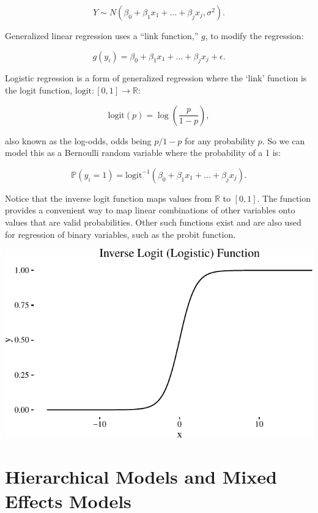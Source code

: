 \documentclass[12pt,twoside]{reedthesis}
\begin{document}
  \[Y \sim N(\beta_0 + \beta_1 x_1 + \ldots + \beta_j x_j, \sigma^2).\]
  
  Generalized linear regression uses a ``link function,'' \(g\), to modify
  the regression:
  
  \[g(y_i) = \beta_0 + \beta_1 x_1 + \ldots + \beta_j x_j + \epsilon.\]
  
  Logistic regression is a form of generalized regression where the `link'
  function is the logit function, \(\text{logit}:[0,1] \to \mathbb{R}\):
  
  \[ \text{logit} (p) = \log \left(\frac{p}{1-p}\right), \]
  
  also known as the log-odds, odds being \(p/1-p\) for any probability
  \(p\). So we can model this as a Bernoulli random variable where the
  probability of a 1 is:
  
  \[\mathbb{P} (y_i = 1) = \text{logit}^{-1} (\beta_0 + \beta_1 x_1 + \ldots + \beta_j x_j).\]
  
  Notice that the inverse logit function maps values from \(\mathbb{R}\)
  to \([0,1]\). The function provides a convenient way to map linear
  combinations of other variables onto values that are valid
  probabilities. Other such functions exist and are also used for
  regression of binary variables, such as the probit function.
  
  \begin{center}\includegraphics{thesis_files/figure-latex/unnamed-chunk-1-1} \end{center}
  
  \section{Hierarchical Models and Mixed Effects
  Models}\label{hierarchical-models-and-mixed-effects-models}
  
\end{document}
